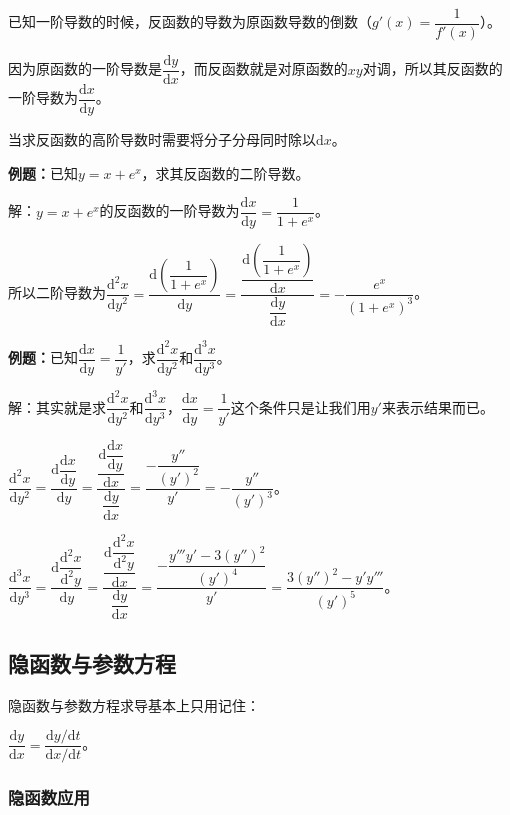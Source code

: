 \documentclass[UTF8, 12pt]{ctexart}
\begin{document}
已知一阶导数的时候，反函数的导数为原函数导数的倒数（$g'(x)=\dfrac{1}{f'(x)}$）。

因为原函数的一阶导数是$\dfrac{\textrm{d}y}{\textrm{d}x}$，而反函数就是对原函数的$xy$对调，所以其反函数的一阶导数为$\dfrac{\textrm{d}x}{\textrm{d}y}$。

当求反函数的高阶导数时需要将分子分母同时除以$\textrm{d}x$。

\textbf{例题：}已知$y=x+e^x$，求其反函数的二阶导数。

解：$y=x+e^x$的反函数的一阶导数为$\dfrac{\textrm{d}x}{\textrm{d}y}=\dfrac{1}{1+e^x}$。\medskip

所以二阶导数为$\dfrac{\textrm{d}^2x}{\textrm{d}y^2}=\dfrac{\textrm{d}\left(\dfrac{1}{1+e^{x}}\right)}{\textrm{d}y}=\dfrac{\dfrac{\textrm{d}\left(\dfrac{1}{1+e^{x}}\right)}{\textrm{d}x}}{\dfrac{\textrm{d}y}{\textrm{d}x}}=-\dfrac{e^x}{(1+e^x)^3}$。

\textbf{例题：}已知$\dfrac{\textrm{d}x}{\textrm{d}y}=\dfrac{1}{y'}$，求$\dfrac{\textrm{d}^2x}{\textrm{d}y^2}$和$\dfrac{\textrm{d}^3x}{\textrm{d}y^3}$。

解：其实就是求$\dfrac{\textrm{d}^2x}{\textrm{d}y^2}$和$\dfrac{\textrm{d}^3x}{\textrm{d}y^3}$，$\dfrac{\textrm{d}x}{\textrm{d}y}=\dfrac{1}{y'}$这个条件只是让我们用$y'$来表示结果而已。

$\dfrac{\textrm{d}^2x}{\textrm{d}y^2}=\dfrac{\textrm{d}\dfrac{\textrm{d}x}{\textrm{d}y}}{\textrm{d}y}=\dfrac{\dfrac{\textrm{d}\dfrac{\textrm{d}x}{\textrm{d}y}}{\textrm{d}x}}{\dfrac{\textrm{d}y}{\textrm{d}x}}=\dfrac{-\dfrac{y''}{(y')^2}}{y'}=-\dfrac{y''}{(y')^3}$。\medskip

$\dfrac{\textrm{d}^3x}{\textrm{d}y^3}=\dfrac{\textrm{d}\dfrac{\textrm{d}^2x}{\textrm{d}^2y}}{\textrm{d}y}=\dfrac{\dfrac{\textrm{d}\dfrac{\textrm{d}^2x}{\textrm{d}^2y}}{\textrm{d}x}}{\dfrac{\textrm{d}y}{\textrm{d}x}}=\dfrac{-\dfrac{y'''y'-3(y'')^2}{(y')^4}}{y'}=\dfrac{3(y'')^2-y'y'''}{(y')^5}$。

\subsection{隐函数与参数方程}

隐函数与参数方程求导基本上只用记住：\medskip

$\dfrac{\textrm{d}y}{\textrm{d}x}=\dfrac{\textrm{d}y/\textrm{d}t}{\textrm{d}x/\textrm{d}t}$。

\subsubsection{隐函数应用}
\end{document}
